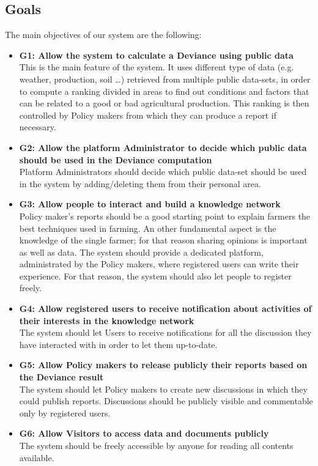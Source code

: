\subsection{Goals}
The main objectives of our system are the following:
\begin{itemize}
    \item \textbf{G1: Allow the system to calculate a Deviance using public data}\\
    This is the main feature of the system. It uses different type of data (e.g. weather, production, soil \dots) retrieved from multiple public data-sets, in order to compute a ranking divided in areas to find out conditions and factors that can be related to a good or bad agricultural production. This ranking is then controlled by Policy makers from which they can produce a report if necessary.
    
    \item \textbf{G2: Allow the platform Administrator to decide which public data should be used in the Deviance computation}\\
    Platform Administrators should decide which public data-set should be used in the system by adding/deleting them from their personal area.
    
    \item \textbf{G3: Allow people to interact and build a knowledge network}\\
    Policy maker's reports should be a good starting point to explain farmers the best techniques used in farming. An other fundamental aspect is the knowledge of the single farmer; for that reason sharing opinions is important as well as data. The system should provide a dedicated platform, administrated by the Policy makers, where registered users can write their experience. For that reason, the system should also let people to register freely.
    
    \item \textbf{G4: Allow registered users to receive notification about activities of their interests in the knowledge network}\\
    The system should let Users to receive notifications for all the discussion they have interacted with in order to let them up-to-date.
    
    \item \textbf{G5: Allow Policy makers to release publicly their reports based on the Deviance result}\\
    The system should let Policy makers to create new discussions in which they could publish reports. Discussions should be publicly visible and commentable only by registered users.

    \item \textbf{G6: Allow Visitors to access data and documents publicly}\\
    The system should be freely accessible by anyone for reading all contents available. 
    
\end{itemize}


